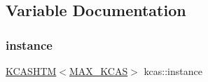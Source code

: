 \subsection{Variable Documentation}
\mbox{\label{namespacekcas_af460e5af7d85e9a87e52d4240e222fb5}} 
\subsubsection{\texorpdfstring{instance}{instance}}
{\footnotesize\ttfamily \hyperlink{classKCASHTM}{K\+C\+A\+S\+H\+TM}$<$\hyperlink{skiplist_8h_a17681fc241567944ff9f0c062af6b7bf}{M\+A\+X\+\_\+\+K\+C\+AS}$>$ kcas\+::instance}

